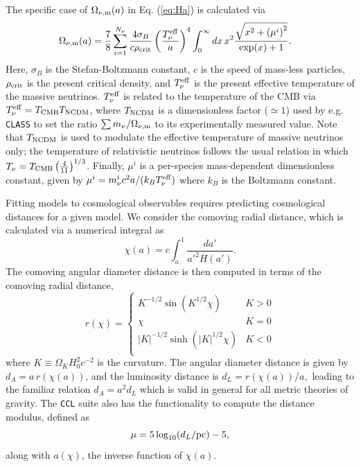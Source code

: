 \documentclass[\docopts]{\docclass}
\newcommand{\ccl}{{\tt CCL}\xspace}
\newcommand{\class}{{\tt CLASS}\xspace}
\begin{document}
The specific case of $\Omega_{\nu, {\rm m}}(a)$ in Eq. (\ref{eq:Ha}) is calculated via
\begin{align}
\Omega_{\nu, {\rm m}}(a) &= \frac{7}{8}\sum_{i=1}^{N_\nu} \frac{4 \sigma_{B}}{c \rho_{{\rm crit}}} \left(\frac{T_{\nu}^{\rm eff}}{a}\right)^4  \int_0^{\infty} dx \, x^2 \frac{\sqrt{x^2 + \left(\mu^i\right)^2}}{\exp(x) + 1}.
\label{Omnu}
\end{align}
Here, $\sigma_B$ is the Stefan-Boltzmann constant, $c$ is the speed of mass-less particles, $\rho_{{\rm crit}}$ is the present critical density, and $T_{\nu}^{\rm eff}$ is the present effective temperature of the massive neutrinos. $T_{\nu}^{\rm eff}$ is related to the temperature of the CMB via $T_{\nu}^{\rm eff} = T_{\rm CMB} T_{\rm NCDM}$, where $T_{\rm NCDM}$ is a dimensionless factor ($\simeq1$) used by e.g. \class to set the ratio ${\sum m_\nu}/{\Omega_{\nu, {\rm m}}}$ to its experimentally measured value. Note that $T_{\rm NCDM}$ is used to modulate the effective temperature of massive neutrinos only; the temperature of relativistic neutrinos follows the usual relation in which $T_\nu = T_{\rm CMB} \left(\frac{4}{11}\right)^{1/3}$. Finally, $\mu^i$ is a per-species mass-dependent dimensionless constant, given by $\mu^i = m_{\nu}^{i}c^2 a / (k_B T_{\nu}^{\rm eff})$ where $k_B$ is the Boltzmann constant.



Fitting models to cosmological observables requires predicting cosmological distances for a given model. We consider the comoving radial distance, which is calculated via a numerical integral as
\begin{equation}
 \chi(a)= c \int_a^1 \frac{da'}{a'^2 H(a')}.
 \label{eq:comrdist}
\end{equation}
The comoving angular diameter distance is then computed in terms of the comoving radial distance,
\begin{equation}\label{eq:angdist}
 r(\chi)=\left\{\begin{array}{cc}
                 K^{-1/2}\sin(K^{1/2}\chi) & K>0\\
                 \chi & K=0\\
                 |K|^{-1/2}\sinh(|K|^{1/2}\chi) & K<0\\
                \end{array}\right.
\end{equation}
where $K \equiv \Omega_K H_0^2 c^{-2}$ is the curvature.
The angular diameter distance is given by $d_A=a\,r(\chi(a))$, and the luminosity distance is
$d_L=r(\chi(a))/a,$ leading to the familiar relation $d_A = a^2d_L$ which is valid in general for all metric theories of gravity.
The \ccl suite also has the functionality to compute the distance modulus, defined as
\begin{equation}\label{eq:distmod}
    \mu = 5 \log_{10}(d_L / {\rm pc})-5,
\end{equation}
along with $a(\chi)$, the inverse function of $\chi(a)$.
\end{document}
